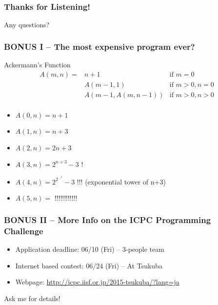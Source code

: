 \documentclass{beamer}
\begin{document}
\begin{frame} 
  \frametitle{Thanks for Listening!}
  \begin{center}
    Any questions?
  \end{center}
\end{frame}

\begin{frame}
  \frametitle{BONUS I -- The most expensive program ever?}

  \begin{block}{Ackermann's Function}
    \begin{eqnarray*}
      A(m,n) = & n+1 & \text{if } m = 0\\
      & A(m-1,1) & \text{if } m > 0, n = 0\\
      & A(m-1,A(m,n-1)) & \text{if } m > 0, n > 0\\
    \end{eqnarray*}
  \end{block}
  
  \begin{itemize}
    \item $A(0,n) = n+1$
    \item $A(1,n) = n+3$
    \item $A(2,n) = 2n+3$
    \item $A(3,n) = 2^{n+3}-3$ \alert{!}
    \item $A(4,n) = 2^{2^{...^2}}-3$ \alert{!!!} (exponential tower of n+3)
    \item $A(5,n) = $ \alert{!!!!!!!!!!!!}
  \end{itemize}
\end{frame}

\begin{frame}
  \frametitle{BONUS II -- More Info on the ICPC Programming Challenge}
  \begin{itemize}
  \item Application deadline: 06/10 (Fri) -- 3-people team
  \item Internet based contest: 06/24 (Fri) -- At Tsukuba
  \item Webpage: \url{http://icpc.iisf.or.jp/2015-tsukuba/?lang=ja}
  \end{itemize}
  \bigskip

  Ask me for details!
\end{frame}
\end{document}

